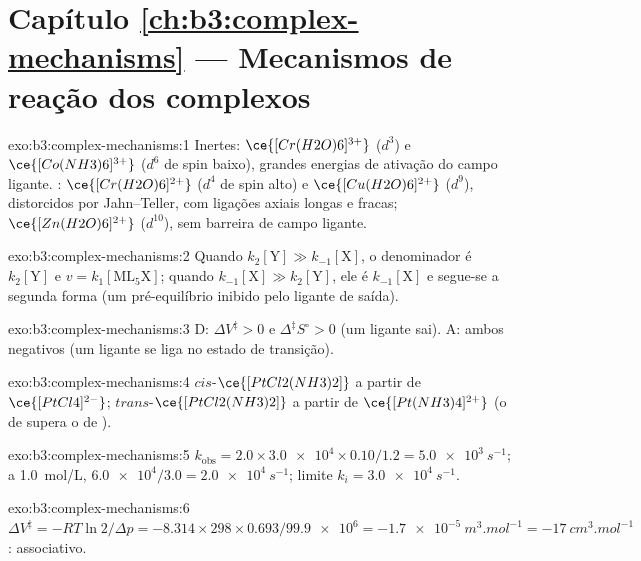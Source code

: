 \section*{Capítulo \ref{ch:b3:complex-mechanisms} --- Mecanismos de reação dos complexos}

\begin{solution}{exo:b3:complex-mechanisms:1}
Inertes: $\ce{[Cr(H2O)6]^{3+}}$ ($d^3$) e $\ce{[Co(NH3)6]^{3+}}$ ($d^6$ de spin baixo), grandes energias de ativação
do campo ligante. : $\ce{[Cr(H2O)6]^{2+}}$ ($d^4$ de spin alto) e $\ce{[Cu(H2O)6]^{2+}}$ ($d^9$),
distorcidos por Jahn--Teller, com ligações axiais longas e fracas; $\ce{[Zn(H2O)6]^{2+}}$ ($d^{10}$), sem barreira de
campo ligante.
\end{solution}

\begin{solution}{exo:b3:complex-mechanisms:2}
Quando $k_2[\mathrm Y] \gg k_{-1}[\mathrm X]$, o denominador é $k_2[\mathrm Y]$ e $v = k_1[\mathrm{ML_5X}]$; quando $k_{-1}[\mathrm X] \gg k_2[\mathrm Y]$, ele é
$k_{-1}[\mathrm X]$ e segue-se a segunda forma (um pré-equilíbrio inibido pelo ligante
de saída).
\end{solution}

\begin{solution}{exo:b3:complex-mechanisms:3}
D: $\Delta V^{\ddagger} > 0$ e $\Delta^{\ddagger}S^\circ > 0$ (um ligante sai). A: ambos negativos (um ligante se liga no
estado de transição).
\end{solution}

\begin{solution}{exo:b3:complex-mechanisms:4}
$cis$-$\ce{[PtCl2(NH3)2]}$ a partir de $\ce{[PtCl4]^{2-}}$; $trans$-$\ce{[PtCl2(NH3)2]}$ a partir de $\ce{[Pt(NH3)4]^{2+}}$ (o
 de  supera o de ).
\end{solution}

\begin{solution}{exo:b3:complex-mechanisms:5}
$k_{\mathrm{obs}} = 2.0 \times \num{3.0e4} \times 0.10/1.2 = \qty{5.0e3}{s^{-1}}$; a \qty{1.0}{mol/L}, $\num{6.0e4}/3.0 = \qty{2.0e4}{s^{-1}}$; limite
$k_i = \qty{3.0e4}{s^{-1}}$.
\end{solution}

\begin{solution}{exo:b3:complex-mechanisms:6}
$\Delta V^{\ddagger} = -RT\ln2/\Delta p = -8.314 \times 298 \times 0.693/\num{99.9e6} = \qty{-1.7e-5}{m^3.mol^{-1}} = \qty{-17}{cm^3.mol^{-1}}$:
associativo.
\end{solution}

